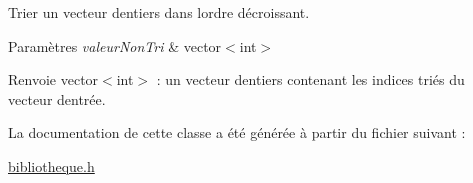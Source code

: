 Trier un vecteur d\textquotesingle{}entiers dans l\textquotesingle{}ordre décroissant. 


\begin{DoxyParams}{Paramètres}
{\em valeur\+Non\+Tri} & vector$<$int$>$ \\
\hline
\end{DoxyParams}
\begin{DoxyReturn}{Renvoie}
vector$<$int$>$ \+: un vecteur d\textquotesingle{}entiers contenant les indices triés du vecteur d\textquotesingle{}entrée. 
\end{DoxyReturn}


La documentation de cette classe a été générée à partir du fichier suivant \+:\begin{DoxyCompactItemize}
\item 
\hyperlink{bibliotheque_8h}{bibliotheque.\+h}\end{DoxyCompactItemize}
